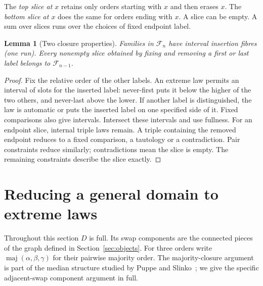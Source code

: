 \documentclass[11pt,letterpaper]{article}
\newtheorem{lemma}[theorem]{Lemma}
\theoremstyle{definition}
\newcommand{\F}{\mathcal F}
\newcommand{\maj}{\operatorname{maj}}
\begin{document}
The \emph{top slice at \(x\)} retains only orders starting with \(x\)
and then erases \(x\). The \emph{bottom slice at \(x\)} does the same
for orders ending with \(x\). A slice can be empty. A sum over slices
runs over the choices of fixed endpoint label.
\begin{lemma}[Two closure properties]\label{lem:interval}
Families in \(\F_n\) have interval insertion fibres (one run). Every nonempty
slice obtained by fixing and removing a first or last label belongs
to \(\F_{n-1}\).
\end{lemma}
\begin{proof}
Fix the relative order of the other labels. An extreme law permits
an interval of slots for the inserted label: never-first puts it
below the higher of the two others, and never-last above the lower.
If another label is distinguished, the law is automatic or puts the
inserted label on one specified side of it. Fixed comparisons also
give intervals. Intersect these intervals and use fullness.
For an endpoint slice, internal triple laws remain. A triple containing
the removed endpoint reduces to a fixed comparison, a tautology or a
contradiction. Pair constraints reduce similarly; contradictions mean
the slice is empty. The remaining constraints describe the slice exactly.
\end{proof}

\clearpage
\section{Reducing a general domain to extreme laws}\label{sec:components}
Throughout this section \(D\) is full. Its swap components are the
connected pieces of the graph defined in Section~\ref{sec:objects}. For
three orders write \(\maj(\alpha,\beta,\gamma)\) for their pairwise
majority order. The majority-closure argument is part of the median
structure studied by Puppe and Slinko~\cite{PuppeSlinko}; we give the
specific adjacent-swap component argument in full.
\end{document}
